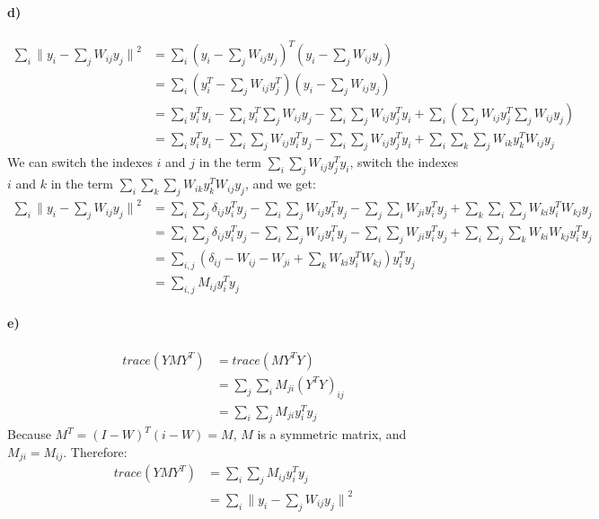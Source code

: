 \documentclass{article}
\begin{document}
\paragraph{d)} 
\begin{align*}
\sum_i {\| y_i - \sum_j W_{ij} y_j \|}^2 &= \sum_i (y_i - \sum_j W_{ij} y_j)^T (y_i - \sum_j W_{ij} y_j) \\
&= \sum_i (y_i^T - \sum_j W_{ij} y_j^T) (y_i - \sum_j W_{ij} y_j) \\
&= \sum_i y_i^T y_i - \sum_i y_i^T \sum_j W_{ij} y_j  - \sum_i \sum_j W_{ij} y_j^T y_i + \sum_i (\sum_j W_{ij} y_j^T \sum_j W_{ij} y_j) \\
&= \sum_i y_i^T y_i - \sum_i \sum_j W_{ij} y_i^T y_j  - \sum_i \sum_j W_{ij} y_j^T y_i + \sum_i \sum_k \sum_j W_{ik}y_k^T W_{ij} y_j 
\end{align*}
We can switch the indexes $i$ and $j$ in the term $\sum_i \sum_j W_{ij} y_j^T y_i$, switch the indexes $i$ and $k$ in the term $\sum_i \sum_k \sum_j W_{ik}y_k^T W_{ij} y_j$, and we get:
\begin{align*}
\sum_i {\| y_i - \sum_j W_{ij} y_j \|}^2 &= \sum_i \sum_j \delta_{ij} y_i^T y_j - \sum_i \sum_j W_{ij} y_i^T y_j  - \sum_j \sum_i W_{ji} y_i^T y_j + \sum_k \sum_i \sum_j W_{ki}y_i^T W_{kj} y_j \\
&= \sum_i \sum_j \delta_{ij} y_i^T y_j - \sum_i \sum_j W_{ij} y_i^T y_j  - \sum_i \sum_j W_{ji} y_i^T y_j + \sum_i \sum_j \sum_k W_{ki} W_{kj} y_i^T y_j \\
&= \sum_{i,j} (\delta_{ij} - W_{ij} - W_{ji} + \sum_k W_{ki}y_i^T W_{kj})y_i^T y_j \\
&= \sum_{i,j} M_{ij}y_i^T y_j
\end{align*}

\paragraph{e)}
\begin{align*}
trace(YMY^T) &= trace(MY^TY) \\
&= \sum_j \sum_i M_{ji} (Y^TY)_{ij} \\
&= \sum_i \sum_j M_{ji} y_i^T y_j
\end{align*}
Because $M^T = (I-W)^T(i-W) = M$, $M$ is a symmetric matrix, and $M_{ji} = M_{ij}$. Therefore:
\begin{align*}
trace(YMY^T) &= \sum_i \sum_j M_{ij} y_i^T y_j \\
&= \sum_i {\| y_i - \sum_j W_{ij} y_j \|}^2
\end{align*}
\end{document}
